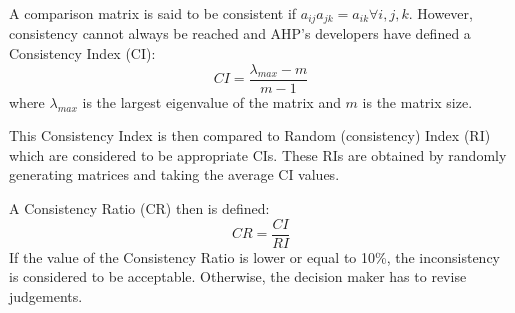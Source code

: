 A comparison matrix is said to be consistent if $a_{ij} a_{jk} = a_{ik} \forall i, j, k$. However, consistency cannot always be reached and AHP's developers have defined a Consistency Index (CI):
\begin{equation}
CI = \frac{\lambda_{max}-m}{m-1}
\end{equation}
where $\lambda_{max}$ is the largest eigenvalue of the matrix and $m$ is the matrix size.

This Consistency Index is then compared to Random (consistency) Index (RI) which are considered to be appropriate CIs. These RIs are obtained by randomly generating matrices and taking the average CI values.

A Consistency Ratio (CR) then is defined:
\begin{equation}
CR = \frac{CI}{RI}
\end{equation}
If the value of the Consistency Ratio is lower or equal to 10\%, the inconsistency is considered to be acceptable. Otherwise, the decision maker has to revise judgements.


